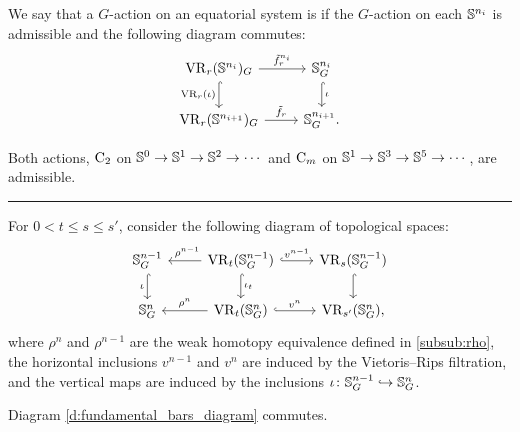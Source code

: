 We say that a \(G\)-action on an equatorial system is  if the \(G\)-action on each \(\mathbb{S}^{n_i}\) is admissible and the following diagram commutes:
\[
\begin{tikzcd}
	\VR_r(\bS^{n_i})_G
	\ar[d, hook, "{\VR_r(\iota)}" left]
	\ar[r, "\tilde f_r^{{n_i}}" above]
	&
	\bS^{n_i}_G
	\ar[d, hook, "\iota"]
	\\
	\VR_r(\bS^{n_{i+1}})_G
	\ar[r, "\tilde f_r" above]
	&
	\bS^{n_{i+1}}_G.
\end{tikzcd}
\]


\lemma Both actions, \(\mathrm{C}_2\) on \(\mathbb{S}^0 \to \mathbb{S}^1 \to \mathbb{S}^2 \to \dotsb\) and \(\mathrm{C}_m\) on \(\mathbb{S}^1 \to \mathbb{S}^3 \to \mathbb{S}^5 \to \dotsb\), are admissible.


\noindent\rule{\textwidth}{0.4pt}

For $0 < t\leq s \leq s'$, consider the following diagram of topological spaces:
\begin{equation}\label{d:fundamental_bars_diagram}
	\begin{tikzcd}
		\bS^{n-1}_G
		\ar[d, hook,"{\iota}" left]
		&
		\VR_t(\bS^{n-1}_G)
		\ar[d, hook,"\iota_t"]
		\ar[l, "\ \rho^{n-1}" above]
		\ar[r, hook, "v^{n-1}"]
		&
		\VR_{s}(\bS^{n-1}_G)
		\ar[d, hook]
		\\
		\bS^{n}_G
		&
		\VR_t(\bS^{n}_G)
		\ar[l, "\rho^n" above]
		\ar[r, hook, "v^{n}"]
		&
		\VR_{s'}(\bS^{n}_G),
	\end{tikzcd}
\end{equation}
where $\rho^n$ and $\rho^{n-1}$ are the weak homotopy equivalence defined in \cref{subsub:rho}, the horizontal inclusions $v^{n-1}$ and $v^n$ are induced by the Vietoris--Rips filtration, and the vertical maps are induced by the inclusions $\iota \colon \mathbb{S}^{n-1}_G \hookrightarrow \mathbb{S}^{n}_G$.

\medskip\lemma
Diagram \eqref{d:fundamental_bars_diagram} commutes.

